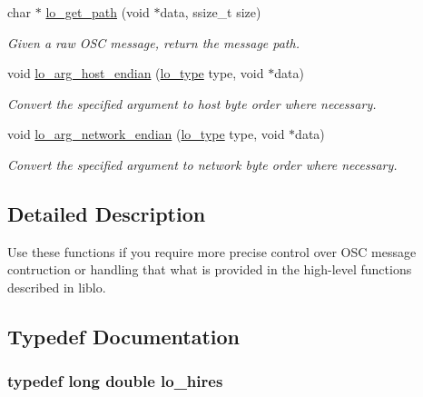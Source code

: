 \begin{DoxyCompactItemize}
char $\ast$ \hyperlink{group__liblolowlevel_gad38872ce4270bbfed9d62a655a4facab}{lo\+\_\+get\+\_\+path} (void $\ast$data, ssize\+\_\+t size)
\begin{DoxyCompactList}\small\item\em Given a raw O\+S\+C message, return the message path. \end{DoxyCompactList}\item 
void \hyperlink{group__liblolowlevel_ga29fc246595334f29d97d11b0186b17bd}{lo\+\_\+arg\+\_\+host\+\_\+endian} (\hyperlink{group__liblo_ga11838c576b0197c255ce805fd7434736}{lo\+\_\+type} type, void $\ast$data)
\begin{DoxyCompactList}\small\item\em Convert the specified argument to host byte order where necessary. \end{DoxyCompactList}\item 
void \hyperlink{group__liblolowlevel_gad775da1d9ef1feaf1b76077143dc3e96}{lo\+\_\+arg\+\_\+network\+\_\+endian} (\hyperlink{group__liblo_ga11838c576b0197c255ce805fd7434736}{lo\+\_\+type} type, void $\ast$data)
\begin{DoxyCompactList}\small\item\em Convert the specified argument to network byte order where necessary. \end{DoxyCompactList}\end{DoxyCompactItemize}


\subsection{Detailed Description}
Use these functions if you require more precise control over O\+S\+C message contruction or handling that what is provided in the high-\/level functions described in liblo. 

\subsection{Typedef Documentation}
\hypertarget{group__liblolowlevel_ga0062385786b0375d4b6954ba1fb8d52b}{
\subsubsection[{lo\+\_\+hires}]{\setlength{\rightskip}{0pt plus 5cm}typedef long double {\bf lo\+\_\+hires}}}\label{group__liblolowlevel_ga0062385786b0375d4b6954ba1fb8d52b}


